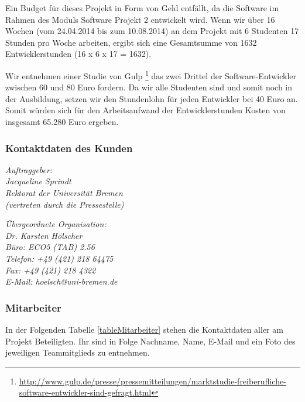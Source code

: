 \documentclass[fontsize=12pt,paper=a4,twoside]{scrartcl}
\begin{document}
Ein Budget für dieses Projekt in Form von Geld entfällt, da die Software im Rahmen des Moduls Software Projekt 2 entwickelt wird. Wenn wir über 16 Wochen (vom 24.04.2014 bis zum 10.08.2014) an dem Projekt mit 6 Studenten 17 Stunden pro Woche arbeiten, ergibt sich eine Gesamtsumme von 1632 Entwicklerstunden (16 x 6 x 17 = 1632).

Wir entnehmen einer Studie von Gulp \footnote{\url{http://www.gulp.de/presse/pressemitteilungen/marktstudie-freiberufliche-software-entwickler-sind-gefragt.html}} das zwei Drittel der Software-Entwickler zwischen 60 und 80 Euro fordern. Da wir alle Studenten sind und somit noch in der Ausbildung, setzen wir den Stundenlohn für jeden Entwickler bei 40 Euro an. Somit würden sich für den Arbeitsaufwand der Entwicklerstunden Kosten von insgesamt 65.280 Euro ergeben.

\subsubsection{Kontaktdaten des Kunden}

{\em Auftraggeber:\\
	Jacqueline Sprindt\\
	Rektorat der Universität Bremen\\
	(vertreten durch die Pressestelle)\\
}

{\em Übergeordnete Organisation:\\ 
	Dr. Karsten Hölscher\\
	Büro: ECO5 (TAB) 2.56\\
    Telefon: +49 (421) 218 64475 \\
    Fax: +49 (421) 218 4322 \\
	E-Mail: hoelsch@uni-bremen.de 
}

\newpage

\subsubsection{Mitarbeiter}\label{sec:Mitarbeiter}

In der Folgenden Tabelle \ref{tableMitarbeiter} stehen die Kontaktdaten aller am Projekt Beteiligten. Ihr sind in Folge Nachname, Name, E-Mail und ein Foto des jeweiligen Teammitglieds zu entnehmen.
\end{document}
